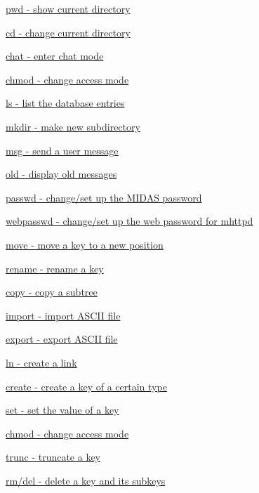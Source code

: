 \begin{TabularC}{2}
\begin{TabularC}{2}
\begin{DoxyItemize}
\begin{DoxyItemize}
\begin{DoxyItemize}
\begin{DoxyItemize}
\begin{DoxyItemize}
\item \hyperlink{RC_odbedit_examples_RC_odbedit_pwd}{pwd -\/ show current directory} 
\item \hyperlink{RC_odbedit_examples_RC_odbedit_cd}{cd -\/ change current directory} 
\item \hyperlink{RC_odbedit_examples_RC_odbedit_chat}{chat -\/ enter chat mode} 
\item \hyperlink{RC_odbedit_examples_RC_odbedit_chmod}{chmod -\/ change access mode} 
\item \hyperlink{RC_odbedit_examples_RC_odbedit_ls}{ls -\/ list the database entries} 
\item \hyperlink{RC_odbedit_examples_RC_odbedit_mkdir}{mkdir -\/ make new subdirectory} 
\item \hyperlink{RC_odbedit_examples_RC_odbedit_msg}{msg -\/ send a user message} 
\item \hyperlink{RC_odbedit_examples_RC_odbedit_old}{old -\/ display old messages} 
\item \hyperlink{RC_odbedit_examples_RC_odbedit_passwd}{passwd -\/ change/set up the MIDAS password} 
\item \hyperlink{RC_odbedit_examples_RC_odbedit_webpasswd}{webpasswd -\/ change/set up the web password for mhttpd} 
\item \hyperlink{RC_odbedit_examples_RC_odbedit_move}{move -\/ move a key to a new position} 
\item \hyperlink{RC_odbedit_examples_RC_odbedit_rename}{rename -\/ rename a key} 
\item \hyperlink{RC_odbedit_examples_RC_odbedit_copy}{copy -\/ copy a subtree} 
\item \hyperlink{RC_odbedit_examples_RC_odbedit_import}{import -\/ import ASCII file} 
\item \hyperlink{RC_odbedit_examples_RC_odbedit_export}{export -\/ export ASCII file} 
\item \hyperlink{RC_odbedit_examples_RC_odbedit_ln}{ln -\/ create a link} 
\item \hyperlink{RC_odbedit_examples_RC_odbedit_cr}{create -\/ create a key of a certain type} 
\item \hyperlink{RC_odbedit_examples_RC_odbedit_set}{set -\/ set the value of a key} 
\item \hyperlink{RC_odbedit_examples_RC_odbedit_chmod}{chmod -\/ change access mode} 
\item \hyperlink{RC_odbedit_examples_RC_odbedit_trunc}{trunc -\/ truncate a key} 
\item \hyperlink{RC_odbedit_examples_RC_odbedit_rm}{rm/del -\/ delete a key and its subkeys} 

\end{DoxyItemize}
\end{DoxyItemize}
\end{DoxyItemize}
\end{DoxyItemize}
\end{DoxyItemize}
\end{TabularC}
\end{TabularC}
